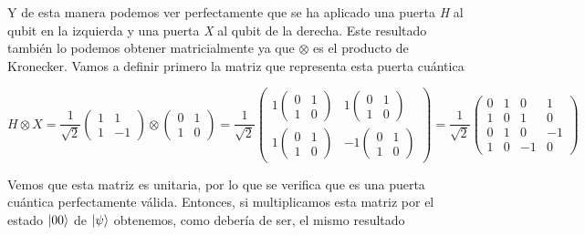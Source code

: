 \documentclass[12pt]{article}
\numberwithin{equation}{section} %
\begin{document}
    \vspace{2.5mm}

    Y de esta manera podemos ver perfectamente que se ha aplicado una puerta \textit{H} al qubit en la izquierda y una puerta \textit{X} al qubit de la derecha. Este resultado también lo podemos obtener matricialmente ya que \( \otimes \) es el producto de Kronecker. Vamos a definir primero la matriz que representa esta puerta cuántica

    \begin{equation*}
        H \otimes X = \frac{1}{\sqrt{2}} \begin{pmatrix}
            1 & 1 \\
            1 & -1 
        \end{pmatrix} \otimes \begin{pmatrix}
            0 & 1 \\
            1 & 0 
        \end{pmatrix} = \frac{1}{\sqrt{2}} \begin{pmatrix}
            1 \begin{pmatrix} 0 & 1 \\ 1 & 0 \end{pmatrix} & 1 \begin{pmatrix} 0 & 1 \\ 1 & 0 \end{pmatrix} \\  
            1 \begin{pmatrix} 0 & 1 \\ 1 & 0 \end{pmatrix} & -1 \begin{pmatrix} 0 & 1 \\ 1 & 0 \end{pmatrix}
        \end{pmatrix} = \frac{1}{\sqrt{2}} \begin{pmatrix}
            0 & 1 & 0 & 1 \\
            1 & 0 & 1 & 0 \\
            0 & 1 & 0 & -1 \\
            1 & 0 & -1 & 0
        \end{pmatrix}
    \end{equation*}

    \vspace{2.5mm}

    Vemos que esta matriz es unitaria, por lo que se verifica que es una puerta cuántica perfectamente válida. Entonces, si multiplicamos esta matriz por el estado \( \ket{0 0} \) de \( \ket{\psi} \) obtenemos, como debería de ser, el mismo resultado
\end{document}
